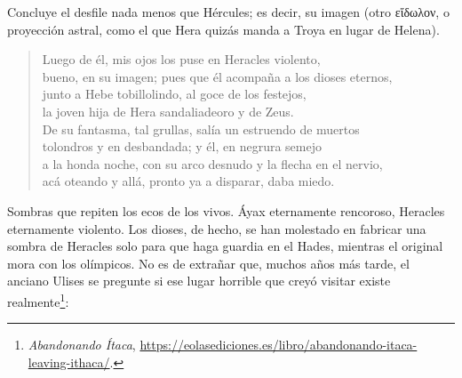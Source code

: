 \documentclass[11pt,a4paper]{article}
\newcommand{\gr}[1]{\foreignlanguage{greek}{#1}}
\begin{document}
Concluye el desfile nada menos que Hércules; es decir, su imagen (otro \gr{εἴδωλον}, o proyección astral, como el que Hera quizás manda a Troya en lugar de Helena).

\begin{verse}
Luego de él, mis ojos los puse en Heracles violento,\\
bueno, en su imagen; pues que él acompaña a los dioses eternos,\\
junto a Hebe tobillolindo, al goce de los festejos,\\
la joven hija de Hera sandaliadeoro y de Zeus.\\
De su fantasma, tal grullas, salía un estruendo de muertos\\
tolondros y en desbandada; y él, en negrura semejo\\
a la honda noche, con su arco desnudo y la flecha en el nervio,\\
acá oteando y allá, pronto ya a disparar, daba miedo.
\end{verse}

Sombras que repiten los ecos de los vivos. Áyax eternamente rencoroso, Heracles eternamente violento. Los dioses, de hecho, se han molestado en fabricar una sombra de Heracles solo para que haga guardia en el Hades, mientras el original mora con los olímpicos. No es de extrañar que, muchos años más tarde, el anciano Ulises se pregunte si ese lugar horrible que creyó visitar existe realmente\footnote{\emph{Abandonando Ítaca}, \url{https://eolasediciones.es/libro/abandonando-itaca-leaving-ithaca/}.}:
\end{document}
